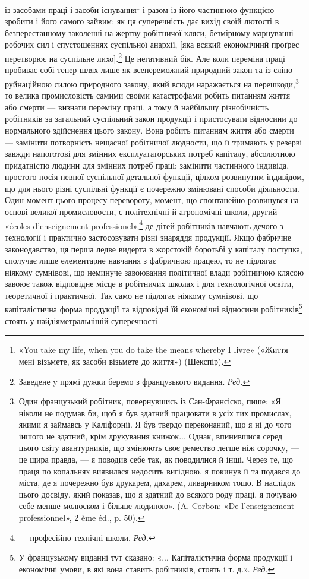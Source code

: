 із засобами праці і засоби існування\footnote{
«You take my life, when you do take the means whereby I livre»
(«Життя мені візьмете, як засоби візьмете до життя») (Шекспір).
} і разом із його частинною
функцією зробити і його самого зайвим; як ця суперечність дає
вихід своїй лютості в безперестанному заколенні на жертву
робітничої кляси, безмірному марнуванні робочих сил і спустошеннях
суспільної анархії, [яка всякий економічний проґрес
перетворює на суспільне лихо].\footnote*{
Заведене y прямі дужки беремо з французького видання. \emph{Ред.}
}  Це негативний бік. Але коли
переміна праці пробиває собі тепер шлях лише як всепереможний
природний закон та із сліпо руйнаційною силою природного закону,
який всюди наражається на перешкоди,\footnote{
Один французький робітник, повернувшись із Сан-Франсіско,
пише: «Я ніколи не подумав би, щоб я був здатний працювати в усіх
тих промислах, якими я займавсь у Каліфорнії. Я був твердо переконаний,
що я ні до чого іншого не здатний, крім друкування книжок... Однак,
впинившися серед цього світу авантурників, що змінюють своє ремество
легше ніж сорочку, — це щира правда, — я поводив себе так, як поводилися
й інші. Через те, що праця по копальнях виявилася недосить вигідною,
я покинув її та подався до міста, де я почережно був друкарем, дахарем,
ливарником тошо. В наслідок цього досвіду, який показав, що я здатний
до всякого роду праці, я почуваю себе менше молюском і більше людиною».
(A. Corbon: «De l’enseignement professionnel», 2 ème éd., p. 50).
} то велика промисловість
самими своїми катастрофами робить питанням життя або
смерти — визнати переміну праці, а тому й найбільшу різнобічність
робітників за загальний суспільний закон продукції і
пристосувати відносини до нормального здійснення цього закону.
Вона робить питанням життя або смерти — замінити потворність
нещасної робітничої людности, що її тримають у резерві завжди
напоготові для змінних експлуататорських потреб капіталу,
абсолютною придатністю людини для змінних потреб праці;
замінити частинного індивіда, простого носія певної суспільної
детальної функції, цілком розвинутим індивідом, що для нього
різні суспільні функції є почережно змінювані способи діяльности.
Один момент цього процесу перевороту, момент, що спонтанейно
розвинувся на основі великої промисловости, є політехнічні й
агрономічні школи, другий — «écoles d’enseignement professionel»,\footnote*{
— професійно-технічні школи. \emph{Ред.}
}
де дітей робітників навчають дечого з технології і практично
застосовувати різні знаряддя продукції. Якщо фабричне законодавство,
ця перша ледве видерта в жорстокій боротьбі у капіталу
поступка, сполучає лише елементарне навчання з фабричною працею,
то не підлягає ніякому сумнівові, що неминуче завоювання
політичної влади робітничою клясою завоює також відповідне
місце в робітничих школах і для технологічної освіти, теоретичної
і практичної. Так само не підлягає ніякому сумнівові, що
капіталістична форма продукції та відповідні їй економічні відносини
робітників\footnote*{
У французькому виданні тут сказано: «... Капіталістична форма
продукції і економічні умови, в які вона ставить робітників, стоять
і т. д.». \emph{Ред.}
} стоять у найдіяметральнішій суперечності